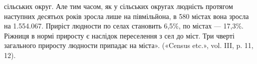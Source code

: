 сільських округ. Але тим часом, як у сільських округах людність протягом наступних десятьох років
зросла лише на півмільйона, в 580 містах вона зросла на 1.554.067. Приріст людности по селах
становить 6,5\%, по містах — 17,3\%. Ріжниця в нормі приросту є наслідок переселення з сел до міст.
Три чверті загального приросту людности припадає на міста». («Census etc.», vol. III, p. 11, 12).

